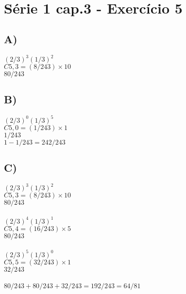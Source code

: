 \section*{Série 1 cap.3 - Exercício 5}
    
    \subsection*{A)}
    $(2/3)^3 (1/3)^2$ \\
    $C5,3 = (8/243) \times 10 $ \\
    $ 80/243 $ \\
    
    \subsection*{B)}
    $(2/3)^0 (1/3)^5$ \\
    $C5,0 = (1/243) \times 1 $ \\
    $ 1/243 $ \\
    $1 - 1/243 = 242/243$ \\
    
    \subsection*{C)}
    $(2/3)^3 (1/3)^2$ \\
    $C5,3 = (8/243) \times 10 $ \\
    $ 80/243 $ \\ \\
    $(2/3)^4 (1/3)^1$ \\
    $C5,4 = (16/243) \times 5 $ \\
    $ 80/243 $ \\ \\
    $(2/3)^5 (1/3)^0$ \\
    $C5,5 = (32/243) \times 1 $ \\
    $ 32/243 $ \\ \\
    $80/243 + 80/243 + 32/243 = 192/243 = 64/81$
